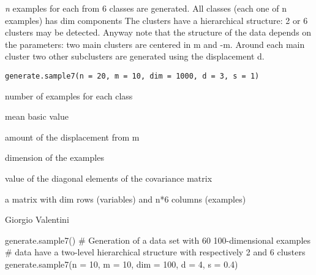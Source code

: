 \documentclass{article}
\begin{document}
\begin{Description}\relax
\emph{n} examples for each from 6 classes are generated.
All classes (each one of n examples) has dim components 
The clusters have a hierarchical structure: 2 or 6 clusters may be detected.
Anyway note that the structure of the data depends on the parameters: two main clusters
are centered in m and -m. Around each main cluster two other subclusters are generated using
the displacement d.
\end{Description}
\begin{Usage}
\begin{verbatim}
generate.sample7(n = 20, m = 10, dim = 1000, d = 3, s = 1)
\end{verbatim}
\end{Usage}
\begin{Arguments}
\begin{ldescription}
\item[\code{n}] number of examples for each class 
\item[\code{m}] mean basic value  
\item[\code{dim}] amount of the displacement from m 
\item[\code{d}] dimension of the examples 
\item[\code{s}] value of the diagonal elements of the covariance matrix 
\end{ldescription}
\end{Arguments}
\begin{Value}
a matrix with dim rows (variables) and n*6 columns (examples)
\end{Value}
\begin{Author}\relax
Giorgio Valentini 
\end{Author}
\begin{Examples}
\begin{ExampleCode}
generate.sample7()
# Generation of a data set with 60 100-dimensional examples
# data have a two-level hierarchical structure with respectively 2 and 6 clusters 
generate.sample7(n = 10, m = 10, dim = 100, d = 4, s = 0.4)
\end{ExampleCode}
\end{Examples}
\end{document}
